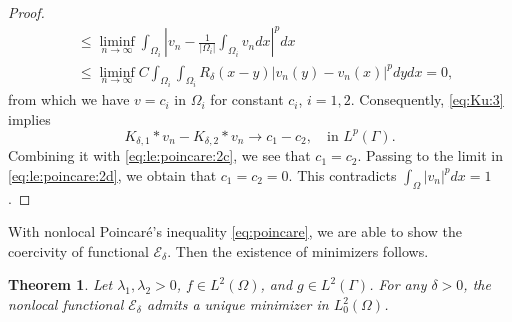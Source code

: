 \documentclass{article}
\newtheorem{theorem}{Theorem}
\theoremstyle{definition}
\begin{document}
\begin{proof}
\begin{align*}
    &\leq \liminf_{n\rightarrow\infty}
    \int_{\Omega_i}\left|v_{n}-\frac{1}{|\Omega_i|}\int_{\Omega_i}v_{n}dx\right|^pdx\\
    &\leq \liminf_{n\rightarrow\infty} C \int_{\Omega_i}\int_{\Omega_i}R_\delta(x-y)|v_{n}(y)-v_{n}(x)|^pdydx=0,
  \end{align*}
  from which we have $v=c_i$ in $\Omega_i$ for constant $c_i$, $i=1,2$.
  Consequently, \eqref{eq:Ku:3} implies
    \[
  K_{\delta,1}\ast v_{n}-K_{\delta,2}\ast v_{n}\rightarrow c_1-c_2, \quad \mbox{in } L^p(\Gamma).
  \]
Combining it with \eqref{eq:le:poincare:2c}, we see that $c_1=c_2$.
  Passing to the limit in \eqref{eq:le:poincare:2d}, we obtain that $c_1=c_2=0$.
  This contradicts $\int_{\Omega}|v_{n}|^pdx=1$.
\end{proof}

With nonlocal Poincar\'{e}'s inequality \eqref{eq:poincare}, we are able to show  the coercivity of functional $\mathcal{E}_\delta$.
Then the existence of minimizers follows.
\begin{theorem}\label{th:existence_nonlocal}
  Let $\lambda_1, \lambda_2>0$, $f\in L^2(\Omega)$, and $g\in L^2(\Gamma)$. For any $\delta>0$, the nonlocal functional $\mathcal{E}_\delta$ admits a unique minimizer in $L^2_0(\Omega)$.
\end{theorem}
\end{document}

